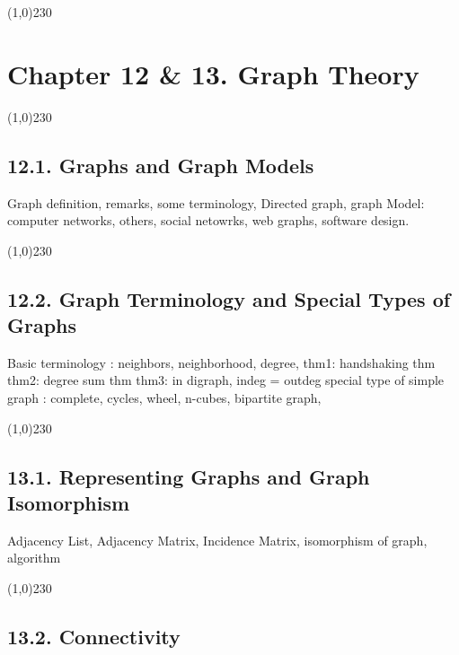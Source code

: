 
\begin{center}
\line(1,0){230}
\end{center}

\section*{Chapter 12 \& 13. Graph Theory}

\begin{center}
\line(1,0){230}
\end{center}

\subsection*{12.1. Graphs and Graph Models}

Graph definition, remarks, some terminology,
Directed graph,
graph Model: computer networks, others, social netowrks, web graphs, software design.

\begin{center}
\line(1,0){230}
\end{center}

\subsection*{12.2. Graph Terminology and Special Types of Graphs}

Basic terminology : neighbors, neighborhood, degree,
thm1: handshaking thm
thm2: degree sum thm
thm3: in digraph, indeg = outdeg
special type of simple graph : complete, cycles, wheel, n-cubes,
bipartite graph,

\begin{center}
\line(1,0){230}
\end{center}

\subsection*{13.1. Representing Graphs and Graph Isomorphism}

Adjacency List,
Adjacency Matrix,
Incidence Matrix,
isomorphism of graph, algorithm

\begin{center}
\line(1,0){230}
\end{center}

\subsection*{13.2. Connectivity}

